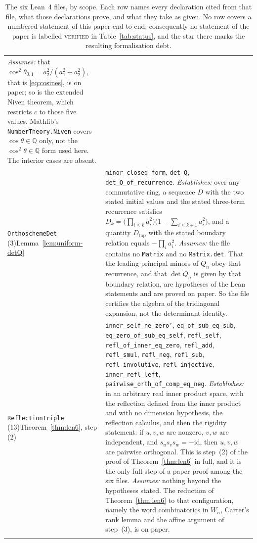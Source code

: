 \documentclass[11pt,a4paper]{article}
\newcommand{\Q}{\mathbb{Q}}
\theoremstyle{definition}
\theoremstyle{remark}
\theoremstyle{plain}
\begin{document}
\begin{longtable}{@{}p{}p{}@{}}
  \emph{Assumes:} that $\cos^2\theta_{0,1}=a_2^2/(a_1^2+a_2^2)$, that is \eqref{eq:cosines},
  is on paper; so is the extended Niven theorem, which restricts $c$ to those five values.
  Mathlib's \texttt{NumberTheory.Niven} covers $\cos\theta\in\Q$ only, not the
  $\cos^2\theta\in\Q$ form used here. The interior cases are absent. \\
\addlinespace
\texttt{OrthoschemeDet} (3)\newline Lemma~\ref{lem:uniform-detQ}
& \texttt{minor\_closed\_form}, \texttt{det\_Q}, \texttt{det\_Q\_of\_recurrence}.\newline
  \emph{Establishes:} over any commutative ring, a sequence $D$ with the two stated initial
  values and the stated three-term recurrence satisfies
  $D_k=\bigl(\prod_{i\le k}a_i^2\bigr)\bigl(1-\sum_{i\le k+1}a_i^2\bigr)$, and a quantity
  $D_{\mathrm{top}}$ with the stated boundary relation equals $-\prod_ia_i^2$.\newline
  \emph{Assumes:} the file contains no \texttt{Matrix} and no \texttt{Matrix.det}. That the
  leading principal minors of $Q_n$ obey that recurrence, and that $\det Q_n$ is given by that
  boundary relation, are hypotheses of the Lean statements and are proved on paper. So the
  file certifies the algebra of the tridiagonal expansion, not the determinant identity. \\
\addlinespace
\texttt{ReflectionTriple} (13)\newline Theorem~\ref{thm:len6}, step (2)
& \texttt{inner\_self\_ne\_zero'}, \texttt{eq\_of\_sub\_eq\_sub},
  \texttt{eq\_zero\_of\_sub\_eq\_self}, \texttt{refl\_self},
  \texttt{refl\_of\_inner\_eq\_zero}, \texttt{refl\_add}, \texttt{refl\_smul},
  \texttt{refl\_neg}, \texttt{refl\_sub}, \texttt{refl\_involutive},
  \texttt{refl\_injective}, \texttt{inner\_refl\_left},
  \texttt{pairwise\_orth\_of\_comp\_eq\_neg}.\newline
  \emph{Establishes:} in an arbitrary real inner product space, with the reflection defined
  from the inner product and with no dimension hypothesis, the reflection calculus, and then
  the rigidity statement: if $u,v,w$ are nonzero, $v,w$ are independent, and
  $s_us_vs_w=-\mathrm{id}$, then $u,v,w$ are pairwise orthogonal. This is step~(2) of the
  proof of Theorem~\ref{thm:len6} in full, and it is the only full step of a paper proof among
  the six files.\newline
  \emph{Assumes:} nothing beyond the hypotheses stated. The reduction of
  Theorem~\ref{thm:len6} to that configuration, namely the word combinatorics in $W_n$,
  Carter's rank lemma and the affine argument of step~(3), is on paper. \\
\bottomrule
\caption{The six Lean~4 files, by scope. Each row names every declaration cited from that file,
what those declarations prove, and what they take as given. No row covers a numbered statement
of this paper end to end; consequently no statement of the paper is labelled
\textsc{verified} in Table~\ref{tab:status}, and the star there marks the resulting
formalisation debt.}
\label{tab:lean}
\end{longtable}
\normalsize
\end{document}
